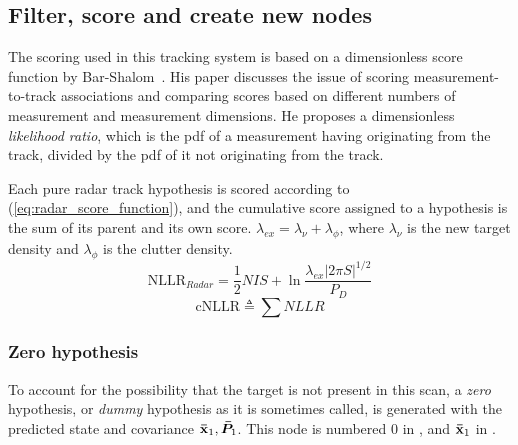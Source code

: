 \subsection{Filter, score and create new nodes}
The scoring used in this tracking system is based on a dimensionless score function by Bar-Shalom~\cite{Bar-Shalom2007}. His paper discusses the issue of scoring measurement-to-track associations and comparing scores based on different numbers of measurement and measurement dimensions. He proposes a dimensionless \emph{likelihood ratio}, which is the \gls{pdf} of a measurement having originating from the track, divided by the \gls{pdf} of it not originating from the track.

Each pure radar \gls{track hypothesis} is scored according to (\ref{eq:radar_score_function}), and the cumulative score assigned to a hypothesis is the sum of its parent and its own score. \( \lambda_{ex} = \lambda_\nu + \lambda_\phi \), where \( \lambda_\nu \) is the new target density and \( \lambda_\phi \) is the clutter density. 
\begin{equation}\label{eq:radar_score_function}
\mathrm{NLLR}_{Radar} = \frac{1}{2} NIS + \ln \frac{\lambda_{ex} |2 \pi S|^{1/2}} {P_D}		
\end{equation}
\begin{equation}
\mathrm{cNLLR} \triangleq \sum NLLR
\end{equation}

\subsubsection{Zero hypothesis}\label{subsubsec:radar_zero_hypothesis}
To account for the possibility that the target is not present in this scan, a \emph{zero} hypothesis, or \emph{dummy} hypothesis as it is sometimes called, is generated with the predicted state and covariance \(\boldsymbol{\mathbf{\bar{x}}}_1, \bm{\bar{P}}_1\). This node is numbered 0 in , and \(\boldsymbol{\mathbf{\bar{x}}}_1\) in .

